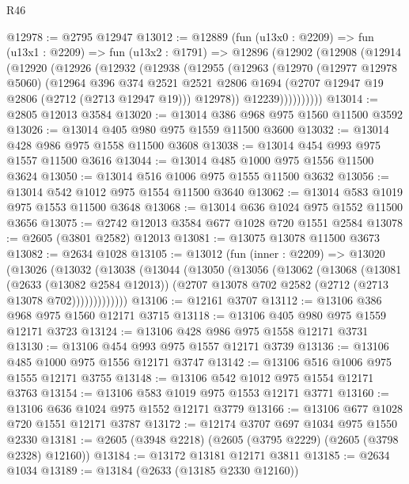 \begin{lexlean}{R46}
\begin{coremodule}
@12978 := @2795 @12947
@13012 := @12889
    (fun (u13x0 : @2209) =>
    fun (u13x1 : @2209) =>
    fun (u13x2 : @1791) =>
    @12896
      (@12902
        (@12908
          (@12914
            (@12920
              (@12926
                (@12932
                  (@12938
                    (@12955
                      (@12963
                        (@12970
                          (@12977 @12978 @5060)
                          (@12964
                            @396
                            @374
                            @2521
                            @2521
                            @2806
                            @1694
                            (@2707 @12947 @19 @2806 (@2712 (@2713 @12947 @19)))
                            @12978))
                        @12239))))))))))
@13014 := @2805 @12013 @3584
@13020 := @13014 @386 @968 @975 @1560 @11500 @3592
@13026 := @13014 @405 @980 @975 @1559 @11500 @3600
@13032 := @13014 @428 @986 @975 @1558 @11500 @3608
@13038 := @13014 @454 @993 @975 @1557 @11500 @3616
@13044 := @13014 @485 @1000 @975 @1556 @11500 @3624
@13050 := @13014 @516 @1006 @975 @1555 @11500 @3632
@13056 := @13014 @542 @1012 @975 @1554 @11500 @3640
@13062 := @13014 @583 @1019 @975 @1553 @11500 @3648
@13068 := @13014 @636 @1024 @975 @1552 @11500 @3656
@13075 := @2742 @12013 @3584 @677 @1028 @720 @1551 @2584
@13078 := @2605 (@3801 @2582) @12013
@13081 := @13075 @13078 @11500 @3673
@13082 := @2634 @1028
@13105 := @13012
    (fun (inner : @2209) =>
    @13020
      (@13026
        (@13032
          (@13038
            (@13044
              (@13050
                (@13056
                  (@13062
                    (@13068
                      (@13081
                        (@2633 (@13082 @2584 @12013))
                        (@2707 @13078 @702 @2582 (@2712 (@2713 @13078 @702)))))))))))))
@13106 := @12161 @3707
@13112 := @13106 @386 @968 @975 @1560 @12171 @3715
@13118 := @13106 @405 @980 @975 @1559 @12171 @3723
@13124 := @13106 @428 @986 @975 @1558 @12171 @3731
@13130 := @13106 @454 @993 @975 @1557 @12171 @3739
@13136 := @13106 @485 @1000 @975 @1556 @12171 @3747
@13142 := @13106 @516 @1006 @975 @1555 @12171 @3755
@13148 := @13106 @542 @1012 @975 @1554 @12171 @3763
@13154 := @13106 @583 @1019 @975 @1553 @12171 @3771
@13160 := @13106 @636 @1024 @975 @1552 @12171 @3779
@13166 := @13106 @677 @1028 @720 @1551 @12171 @3787
@13172 := @12174 @3707 @697 @1034 @975 @1550 @2330
@13181 := @2605 (@3948 @2218) (@2605 (@3795 @2229) (@2605 (@3798 @2328) @12160))
@13184 := @13172 @13181 @12171 @3811
@13185 := @2634 @1034
@13189 := @13184 (@2633 (@13185 @2330 @12160))

\end{coremodule}
\end{lexlean}
